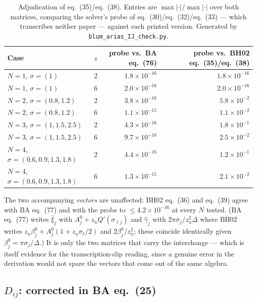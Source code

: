 \documentclass[11pt,a4paper]{article}
\newcommand{\eqBH}[1]{eq.~(#1)}
\newcommand{\code}[1]{\texttt{#1}}
\begin{document}
\begin{table}[htbp]
\centering
\small
\caption{Adjudication of \eqBH{35}/\eqBH{38}. Entries are
$\max|\cdot|/\max|\cdot|$ over both matrices, comparing the solver's probe of
\eqBH{30}/\eqBH{32}/\eqBH{33} --- which transcribes neither paper --- against
each printed version. Generated by \code{blum\_arias\_IJ\_check.py}.}
\label{tab:adjudication}
\begin{tabular}{@{}llrr@{}}
\toprule
Case & $z$ & probe vs.\ BA \eqBH{76} & probe vs.\ BH02 \eqBH{35}/\eqBH{38}\\
\midrule
$N=1$, $\sigma=(1)$ & 2 & $1.8\times10^{-16}$ & $1.8\times10^{-16}$\\
$N=1$, $\sigma=(1)$ & 6 & $2.0\times10^{-16}$ & $2.0\times10^{-16}$\\
$N=2$, $\sigma=(0.8,1.2)$ & 2 & $3.8\times10^{-16}$ & $5.8\times10^{-2}$\\
$N=2$, $\sigma=(0.8,1.2)$ & 6 & $1.1\times10^{-15}$ & $1.1\times10^{-2}$\\
$N=3$, $\sigma=(1,1.5,2.5)$ & 2 & $4.3\times10^{-16}$ & $1.8\times10^{-1}$\\
$N=3$, $\sigma=(1,1.5,2.5)$ & 6 & $9.7\times10^{-16}$ & $2.5\times10^{-2}$\\
$N=4$, $\sigma=(0.6,0.9,1.3,1.8)$ & 2 & $4.4\times10^{-16}$ & $1.2\times10^{-1}$\\
$N=4$, $\sigma=(0.6,0.9,1.3,1.8)$ & 6 & $1.3\times10^{-15}$ & $2.1\times10^{-2}$\\
\bottomrule
\end{tabular}
\end{table}

The two accompanying \emph{vectors} are unaffected: BH02 \eqBH{36} and
\eqBH{39} agree with BA \eqBH{77} and with the probe to
$\le4.2\times10^{-16}$ at every $N$ tested. (BA \eqBH{77} writes
$\hat\xi_j$ with $A^0_j+z_nQ'(\sigma_{\ell j})$ and $\hat\gamma_j$ with
$2\pi\sigma_j/z_n^2\Delta$ where BH02 writes $z_n\beta^0_j+A^0_j(1+z_n\sigma_\ell/2)$
and $2\beta^0_j/z_n^2$; these coincide identically given
$\beta^0_j=\pi\sigma_j/\Delta$.) It is only the two matrices that carry the
interchange --- which is itself evidence for the transcription-slip reading,
since a genuine error in the derivation would not spare the vectors that come
out of the same algebra.

\subsection{$D_{ij}$: corrected in BA \eqBH{25}}
\end{document}
